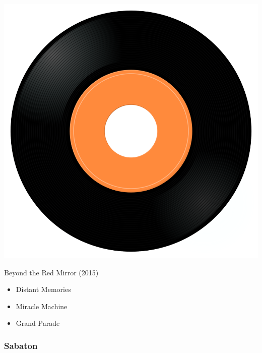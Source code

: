 \begin{minipage}[t]{0.25\textwidth}
\captionsetup{type=figure}
\includegraphics[width=\textwidth]{Images/cover.png}
\caption*{Beyond the Red Mirror (2015)}
\end{minipage}
\begin{minipage}[t]{0.25\textwidth}\vspace{0pt}
\begin{itemize}[nosep,leftmargin=1em,labelwidth=*,align=left]
	\setlength{\itemsep}{0pt}
	\item Distant Memories
	\item Miracle Machine
	\item Grand Parade
\end{itemize}
\end{minipage}

\subsubsection{Sabaton}

